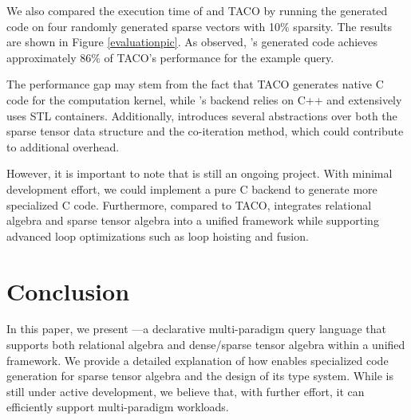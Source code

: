 \documentclass[acmsmall,nonacm]{acmart}\settopmatter{printfolios=true,printccs=false,printacmref=false}
\newcommand{\rhyme}{\text{Rhyme}\xspace}
\begin{document}

We also compared the execution time of \rhyme and TACO by running the generated code on four randomly generated sparse vectors with 10$\%$ sparsity. The results are shown in Figure \ref{evaluationpic}. As observed, \rhyme's generated code achieves approximately $86\%$ of TACO's performance for the example query.\par
The performance gap may stem from the fact that TACO generates native C code for the computation kernel, while \rhyme's backend relies on C++ and extensively uses STL containers. Additionally, \rhyme introduces several abstractions over both the sparse tensor data structure and the co-iteration method, which could contribute to additional overhead.\par
However, it is important to note that \rhyme is still an ongoing project. With minimal development effort, we could implement a pure C backend to generate more specialized C code. Furthermore, compared to TACO, \rhyme integrates relational algebra and sparse tensor algebra into a unified framework while supporting advanced loop optimizations such as loop hoisting and fusion.
\section{Conclusion}\label{conclusion}

In this paper, we present \rhyme—a declarative multi-paradigm query language that supports both relational algebra and dense/sparse tensor algebra within a unified framework. We provide a detailed explanation of how \rhyme enables specialized code generation for sparse tensor algebra and the design of its type system. While \rhyme is still under active development, we believe that, with further effort, it can efficiently support multi-paradigm workloads.


\end{document}
